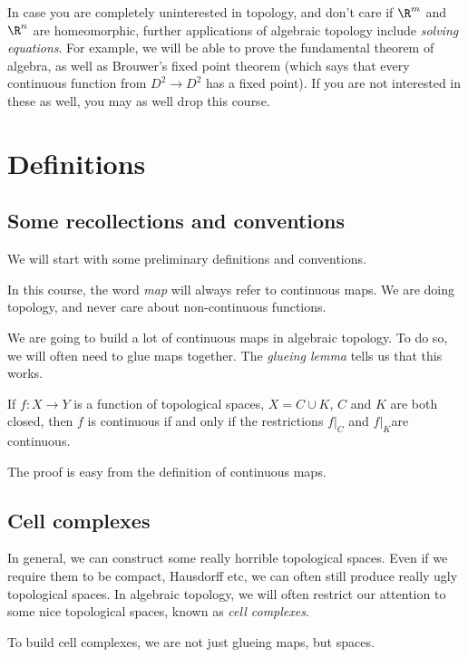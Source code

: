 \documentclass[a4paper]{article}
\begin{document}
In case you are completely uninterested in topology, and don't care if $\R^m$ and $\R^n$ are homeomorphic, further applications of algebraic topology include \emph{solving equations}. For example, we will be able to prove the fundamental theorem of algebra, as well as Brouwer's fixed point theorem (which says that every continuous function from $D^2 \to D^2$ has a fixed point). If you are not interested in these as well, you may as well drop this course.

\section{Definitions}
\subsection{Some recollections and conventions}
We will start with some preliminary definitions and conventions.

\begin{defi}[Map]
  In this course, the word \emph{map} will always refer to continuous maps. We are doing topology, and never care about non-continuous functions.
\end{defi}

We are going to build a lot of continuous maps in algebraic topology. To do so, we will often need to glue maps together. The \emph{glueing lemma} tells us that this works.
\begin{lemma}
  If $f: X\to Y$ is a function of topological spaces, $X = C\cup K$, $C$ and $K$ are both closed, then $f$ is continuous if and only if the restrictions $f|_C$ and $f|_K$are continuous.
\end{lemma}
The proof is easy from the definition of continuous maps.

\subsection{Cell complexes}
In general, we can construct some really horrible topological spaces. Even if we require them to be compact, Hausdorff etc, we can often still produce really ugly topological spaces. In algebraic topology, we will often restrict our attention to some nice topological spaces, known as \emph{cell complexes}.

To build cell complexes, we are not just glueing maps, but spaces.
\end{document}
